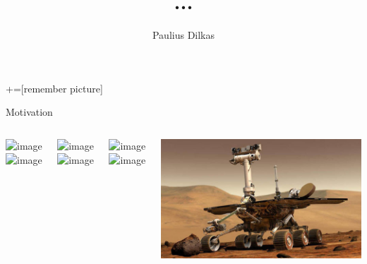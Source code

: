 \documentclass{beamer}
\author{Paulius Dilkas}
\title{...} %
\institute[]{School of Computing Science}
\begin{document}
\maketitle
{}+=[remember picture]

\begin{frame}{Motivation}
  \begin{columns}[t]
    \centering
    \begin{overlayarea}{\textwidth}{0.5\textheight}
      \includegraphics<-2>[width=\textwidth]{uav.jpg}
      \includegraphics<3->[width=\textwidth]{drone.jpg}
    \end{overlayarea}
    \begin{overlayarea}{\textwidth}{0.5\textheight}
      \includegraphics<-3>[width=\textwidth]{underwater.jpg}
      \includegraphics<4->[width=\textwidth]{boat.png}
    \end{overlayarea}
    \centering
    \begin{overlayarea}{\textwidth}{0.5\textheight}
      \includegraphics<1>[width=\textwidth]{ground.jpg}
      \includegraphics<2->[width=\textwidth]{car.jpg}
    \end{overlayarea}
    \includegraphics[width=\textwidth]{rover.jpg}
  \end{columns}
\end{frame}
\end{document}
